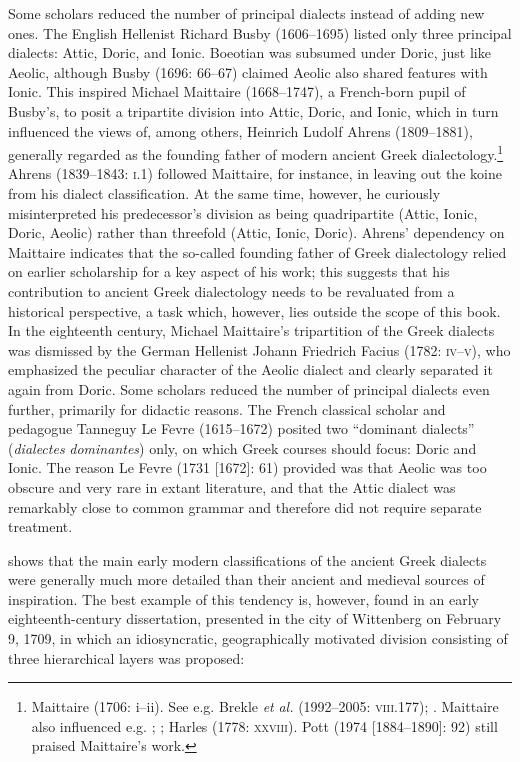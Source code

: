 \documentclass[output=paper]{langsci/langscibook}
\begin{document}
Some scholars reduced the number of principal dialects instead of adding new ones. The English Hellenist Richard Busby (1606–1695) listed only three principal dialects: Attic, Doric, and Ionic. Boeotian was subsumed under Doric, just like Aeolic, although Busby (1696: 66–67) claimed Aeolic also shared features with Ionic. This inspired Michael Maittaire (1668–1747), a French-born pupil of Busby’s, to posit a tripartite division into Attic, Doric, and Ionic, which in turn influenced the views of, among others, Heinrich Ludolf Ahrens (1809–1881), generally regarded as the founding father of modern ancient Greek dialectology.\footnote{Maittaire (1706: i–ii). See e.g. Brekle \textit{et} \textit{al.} (1992–2005: \textsc{viii}.177); \citet[463]{Finkelberg2014}. Maittaire also influenced e.g. \citet[213]{Thompson1732}; \citet[162]{Gesner1774}; Harles (1778: \textsc{xxviii}). Pott (1974 [1884–1890]: 92) still praised Maittaire’s work.} Ahrens (1839–1843: \textsc{i.}1) followed Maittaire, for instance, in leaving out the koine from his dialect classification. At the same time, however, he curiously misinterpreted his predecessor’s division as being quadripartite (Attic, Ionic, Doric, Aeolic) rather than threefold (Attic, Ionic, Doric). Ahrens’ dependency on Maittaire indicates that the so-called founding father of Greek dialectology relied on earlier scholarship for a key aspect of his work; this suggests that his contribution to ancient Greek dialectology needs to be revaluated from a historical perspective, a task which, however, lies outside the scope of this book. In the eighteenth century, Michael Maittaire’s tripartition of the Greek dialects was dismissed by the German Hellenist Johann Friedrich Facius (1782: \textsc{iv–v}), who emphasized the peculiar character of the Aeolic dialect and clearly separated it again from Doric. Some scholars reduced the number of principal dialects even further, primarily for didactic reasons. The French classical scholar and pedagogue Tanneguy Le Fevre (1615–1672) posited two “dominant dialects” (\textit{dialectes} \textit{dominantes}) only, on which Greek courses should focus: Doric and Ionic. The reason Le Fevre (1731 [1672]: 61) provided was that Aeolic was too obscure and very rare in extant literature, and that the Attic dialect was remarkably close to common grammar and therefore did not require separate treatment.

 shows that the main early modern classifications of the ancient Greek dialects were generally much more detailed than their ancient and medieval sources of inspiration. The best example of this tendency is, however, found in an early eighteenth-century dissertation, presented in the city of Wittenberg on February 9, 1709, in which an idiosyncratic, geographically motivated division consisting of three hierarchical layers was proposed:
\end{document}
